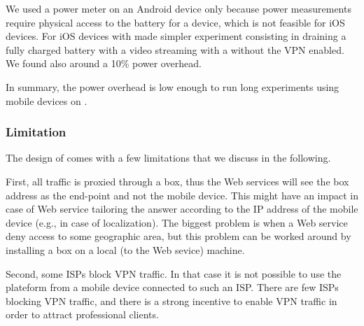 We used a power meter on an Android device only because power
measurements require physical access to the battery for a device,
which is not feasible for iOS devices. For iOS devices with made
simpler experiment consisting in draining a fully charged battery with
a video streaming with a without the VPN enabled. We found also around
a 10\% power overhead. 

In summary, the power overhead is low enough to run long experiments
using mobile devices on \platname. 



\subsubsection{Limitation}
The design of \platname{} comes with a few limitations that we discuss
in the following. 

First, all traffic is proxied through a \platname{} box, thus the Web
services will see the \platname{} box address as the end-point and not
the mobile device. This might have an impact in case of Web service
tailoring the answer according to the IP address of the mobile device
(e.g., in case of localization). The biggest problem is when a Web
service deny access to some geographic area, but this problem can be
worked around by installing a \platname{} box on a local (to the Web
sevice) machine.

Second, some ISPs block VPN traffic. In that case it is not possible
to use the \platname{} plateform from a mobile device connected to
such an ISP. There are few ISPs blocking VPN traffic, and there is a
strong incentive to enable VPN traffic in order to attract
professional clients. 


